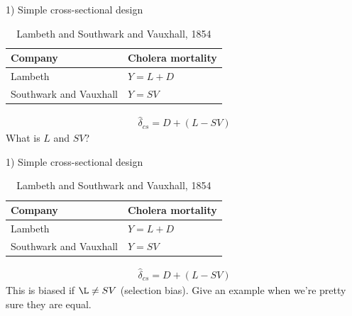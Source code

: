 \documentclass{beamer}
\begin{document}
\begin{frame}{1) Simple cross-sectional design}

\begin{table}\centering
		\caption{Lambeth and Southwark and Vauxhall, 1854}
		\begin{center}
		\begin{tabular}{ll}
		\toprule
		\multicolumn{1}{l}{\textbf{Company}}&
		\multicolumn{1}{c}{\textbf{Cholera mortality}}\\
		\midrule
		Lambeth  & $Y=L + D$ \\
		Southwark and Vauxhall  & $Y=SV$ \\
		\bottomrule
		\end{tabular}
		\end{center}
	\end{table}

\bigskip

\begin{eqnarray*}
\widehat{\delta}_{cs} = D + (L-SV)
\end{eqnarray*}What is $L$ and $SV$?  

\end{frame}

\begin{frame}{1) Simple cross-sectional design}

\begin{table}\centering
		\caption{Lambeth and Southwark and Vauxhall, 1854}
		\begin{center}
		\begin{tabular}{ll}
		\toprule
		\multicolumn{1}{l}{\textbf{Company}}&
		\multicolumn{1}{c}{\textbf{Cholera mortality}}\\
		\midrule
		Lambeth  & $Y=L + D$ \\
		Southwark and Vauxhall  & $Y=SV$ \\
		\bottomrule
		\end{tabular}
		\end{center}
	\end{table}

\bigskip

\begin{eqnarray*}
\widehat{\delta}_{cs} = D + (L-SV)
\end{eqnarray*}This is biased if $\L \neq SV$ (selection bias). Give an example when we're pretty sure they are equal.

\end{frame}
\end{document}
